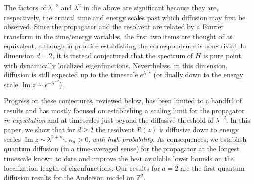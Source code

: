 \documentclass[11pt]{amsart}
\def\bbZ{{\mathbb Z}}
\newcommand{\Impt}{\operatorname*{Im}}
\numberwithin{equation}{section}
\numberwithin{theorem}{section}
\begin{document}
The factors of $\lambda^{-2}$ and $\lambda^2$ in the above are significant because they are, respectively, the critical time and energy scales past which diffusion may first be observed. Since the propagator and the resolvent are related by a Fourier transform in the time/energy variables, the first two items are thought of as equivalent, although in practice establishing the correspondence is non-trivial. In dimension $d=2$, it is instead conjectured that the spectrum of $H$ is pure point with dynamically localized eigenfunctions.
Nevertheless, in this dimension, diffusion is still expected up to the timescale $e^{\lambda^{-2}}$ (or dually down to the energy scale $\Impt z\sim e^{-\lambda^{-2}}$).

Progress on these conjectures, reviewed below, has been limited to a handful of results
and has mostly focused on establishing a scaling limit for the propagator \emph{in expectation} and at timescales just beyond the diffusive threshold of $\lambda^{-2}$.
In this paper, we show that for $d\geq 2$ the resolvent $R(z)$ is diffusive down to energy scales $\Impt z\sim\lambda^{2+\kappa_d}$, $\kappa_d>0$, \emph{with high probability}.
As consequences, we establish quantum diffusion (in a time-averaged sense) for the propagator at the longest timescale known to date and improve the best available lower bounds on the localization length of eigenfunctions.
Our results for $d=2$ are the first quantum diffusion results for the Anderson model on $\bbZ^2$.
\end{document}
